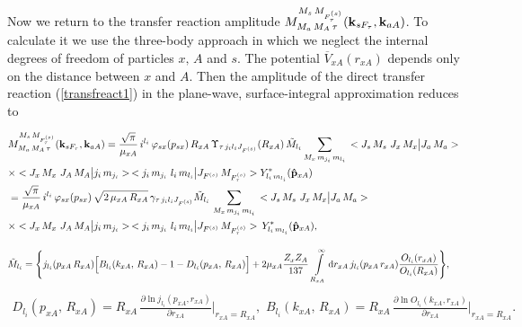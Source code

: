 \documentclass[prl,unsortedaddress,groupedaddress,twocolumn,amsmath,amsfonts,amssymb,showpacs,floatfix,nofootinbib]{revtex4}
\begin{document}
Now we return to the transfer reaction amplitude $M_{M_{a}\,M_{A}\,\tau}^{M_{s}\,M_{F_{\tau}^{(s)}}}({\rm {\bf k}}_{sF_{\tau}},{\rm {\bf k}}_{aA})$.
To calculate it we use the three-body approach   in which we neglect the internal degrees of freedom of particles $x,\,A$ and $s$.  The potential ${\overline V}_{xA}(r_{xA})$ depends only on the distance between $x$ and $A$.  Then the amplitude of the direct  transfer reaction (\ref{transfreact1}) in the plane-wave, surface-integral approximation reduces to \cite{reviewpaper,muk2011}
\begin{widetext}
\begin{align}
&M_{M_{a}\,M_{A}\,\tau}^{M_{s}\,M_{F_{\tau}^{(s)}}}({\rm {\bf k}}_{sF_{\tau}},{\rm {\bf k}}_{aA}) =  \frac{\sqrt{\pi}}{\mu_{xA}}\,i^{l_{i}}\,\varphi_{sx}(p_{sx})\,R_{xA}\,\Upsilon_{\tau\,j_{i}l_{i}J_{F^{(s)}}}(R_{xA})\,
{\tilde M}_{l_{i}}\sum\limits_{M_{x}\,m_{j_{i}}\,m_{l_{i}}}\, <J_{s}\,M_{s}\,\,J_{x}\,M_{x} \big|J_{a}\,M_{a}>         \nonumber\\
& \times <J_{x}\,M_{x}\,\,J_{A}\,M_{A} \big|j_{i}\,m_{j_{i}}> \,<j_{i}\,m_{j_{i}}\,\,l_{i}\,m_{l_{i}} \big| J_{F^{(s)}}\,M_{  F_{\tau}^{ (s) } }>Y_{l_{i}\,m_{l_{i}}}^{*}({\rm {\bf {\hat p}}}_{xA})
\nonumber\\
&=\frac{\sqrt{\pi}}{\mu_{xA}}\,i^{l_{i}}\,\varphi_{sx}(p_{sx})\,\sqrt{2\,\mu_{xA}\,R_{xA}}\,\gamma_{\tau\,j_{i}l_{i}J_{F^{(s)}}}
{\tilde M}_{l_{i}}\,\sum\limits_{M_{x}\,m_{j_{i}}\,m_{l_{i}}}\, <J_{s}\,M_{s}\,\,J_{x}\,M_{x} \big|J_{a}\,M_{a}>         \nonumber\\
& \times <J_{x}\,M_{x}\,\,J_{A}\,M_{A} \big|j_{i}\,m_{j_{i}}> \,<j_{i}\,m_{j_{i}}\,\,l_{i}\,m_{l_{i}} \big| J_{F^{(s)}}\,M_{F_{\tau}^{(s)}}>\,Y_{l_{i}\,m_{l_{i}}}^{*}({\rm {\bf {\hat p}}}_{xA}),
\label{THradamplSurf11}
\end{align}
\end{widetext}
\begin{widetext}
\begin{align}
&{\tilde M}_{l_{i}} =\Bigg\{ j_{l_{i}}(p_{xA}\,R_{xA}) \Big[ B_{l_{i}}(k_{xA},\,R_{xA}) - 1 - D_{l_{i}}(p_{xA},\,R_{xA}) \Big]
+ 2\mu_{xA}\frac{Z_{x}Z_{A}}{137}\,\int\limits_{R_{xA}}^{\infty}{\rm d}r_{xA}\,  j_{l_{i}}(p_{xA}\,r_{xA})   \frac{O_{l_{i}}(r_{xA})}{O_{l_{i}}(R_{xA})} \Bigg\},
\label{Mtau3}
\end{align}
\begin{eqnarray}
D_{l_{i}}(p_{xA},\,R_{xA})= R_{xA}\,\frac{  {\partial \ln j_{l_{i}}(p_{xA},r_{xA} ) }}{\partial r_{xA} } \Big|_{r_{xA}=R_{xA}},\,\,
B_{l_{i}}(k_{xA},\,R_{xA})= R_{xA}\,\frac{ {\partial \ln O_{l_{i}}(k_{xA},r_{xA})}}{\partial r_{xA}}\Big|_{r_{xA}=R_{xA}}.
\label{DB1}
\end{eqnarray}
\end{widetext}
\end{document}
